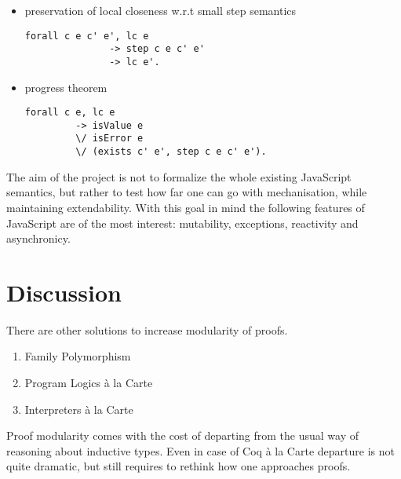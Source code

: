 \documentclass[sigplan,nonacm]{acmart}
\begin{document}
\begin{itemize}
  \item preservation of local closeness w.r.t small step semantics

\begin{lstlisting}[numbers=none]
forall c e c' e', lc e 
               -> step c e c' e' 
               -> lc e'. 
\end{lstlisting}

\item progress theorem 
\begin{lstlisting}[numbers=none]
forall c e, lc e 
         -> isValue e 
         \/ isError e
         \/ (exists c' e', step c e c' e').
\end{lstlisting}
\end{itemize}





The aim of the project is not to formalize the whole existing JavaScript semantics, but rather to test how far one can go with mechanisation, while maintaining extendability. 
With this goal in mind the following features of JavaScript are of the most interest: mutability, exceptions, reactivity and asynchronicy. 

\section{Discussion}

There are other solutions to increase modularity of proofs. 


\begin{enumerate}
  \item Family Polymorphism\cite{jin2023extensible}
  \item Program Logics à la Carte\cite{vistrup2025program}
  \item Interpreters à la Carte\cite{van2022intrinsically}
\end{enumerate}



Proof modularity comes with the cost of departing from the usual way of reasoning about inductive types. 
Even in case of Coq à la Carte departure is not quite dramatic, but still requires to rethink how one approaches proofs.
\end{document}
